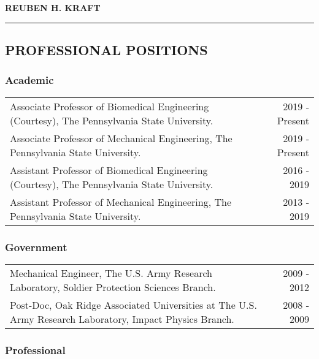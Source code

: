 \documentclass[11pt]{article}
\author{}
\date{}
\begin{document}
\begin{center}
\LARGE \textbf{\textsc{REUBEN H. 
KRAFT}} \\
\rule{\linewidth}{2pt}
\end{center}


\normalsize %





\subsection{PROFESSIONAL POSITIONS}\label{professional-positions}

\subsubsection{Academic}\label{academic}

\begin{tabularx}{\textwidth}{@{}Xr@{}}
Associate Professor of Biomedical Engineering (Courtesy), The Pennsylvania State University. & 2019 - Present \\
\addlinespace[5pt]
Associate Professor of Mechanical Engineering, The Pennsylvania State University. & 2019 - Present \\
\addlinespace[5pt]
Assistant Professor of Biomedical Engineering (Courtesy), The Pennsylvania State University. & 2016 - 2019 \\
\addlinespace[5pt]
Assistant Professor of Mechanical Engineering, The Pennsylvania State University. & 2013 - 2019\end{tabularx}

\subsubsection{Government}\label{government}

\begin{tabularx}{\textwidth}{@{}Xr@{}}
Mechanical Engineer, The U.S. 
Army Research Laboratory, Soldier Protection Sciences Branch. & 2009 - 2012 \\
\addlinespace[5pt]
Post-Doc, Oak Ridge Associated Universities at The U.S. 
Army Research Laboratory, Impact Physics Branch. & 2008 - 2009\end{tabularx}

\subsubsection{Professional}\label{professional}
\end{document}

